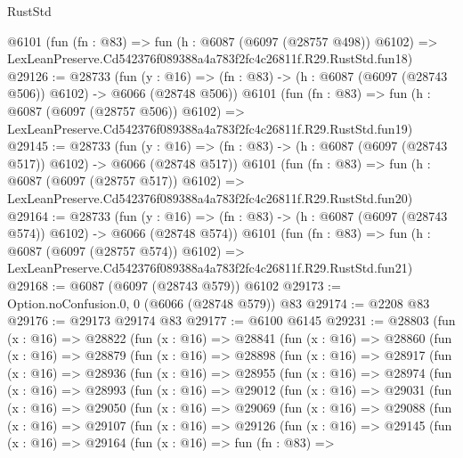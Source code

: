 \begin{lexlean}{RustStd}
\begin{coremodule}
    @6101
    (fun (fn : @83) =>
    fun (h : @6087 (@6097 (@28757 @498)) @6102) =>
    LexLeanPreserve.Cd542376f089388a4a783f2fc4c26811f.R29.RustStd.fun18)
@29126 := @28733
    (fun (y : @16) => (fn : @83) -> (h : @6087 (@6097 (@28743 @506)) @6102) -> @6066 (@28748 @506))
    @6101
    (fun (fn : @83) =>
    fun (h : @6087 (@6097 (@28757 @506)) @6102) =>
    LexLeanPreserve.Cd542376f089388a4a783f2fc4c26811f.R29.RustStd.fun19)
@29145 := @28733
    (fun (y : @16) => (fn : @83) -> (h : @6087 (@6097 (@28743 @517)) @6102) -> @6066 (@28748 @517))
    @6101
    (fun (fn : @83) =>
    fun (h : @6087 (@6097 (@28757 @517)) @6102) =>
    LexLeanPreserve.Cd542376f089388a4a783f2fc4c26811f.R29.RustStd.fun20)
@29164 := @28733
    (fun (y : @16) => (fn : @83) -> (h : @6087 (@6097 (@28743 @574)) @6102) -> @6066 (@28748 @574))
    @6101
    (fun (fn : @83) =>
    fun (h : @6087 (@6097 (@28757 @574)) @6102) =>
    LexLeanPreserve.Cd542376f089388a4a783f2fc4c26811f.R29.RustStd.fun21)
@29168 := @6087 (@6097 (@28743 @579)) @6102
@29173 := Option.noConfusion.{0, 0} (@6066 (@28748 @579)) @83
@29174 := @2208 @83
@29176 := @29173 @29174 @83
@29177 := @6100 @6145
@29231 := @28803
    (fun (x : @16) =>
    @28822
      (fun (x : @16) =>
      @28841
        (fun (x : @16) =>
        @28860
          (fun (x : @16) =>
          @28879
            (fun (x : @16) =>
            @28898
              (fun (x : @16) =>
              @28917
                (fun (x : @16) =>
                @28936
                  (fun (x : @16) =>
                  @28955
                    (fun (x : @16) =>
                    @28974
                      (fun (x : @16) =>
                      @28993
                        (fun (x : @16) =>
                        @29012
                          (fun (x : @16) =>
                          @29031
                            (fun (x : @16) =>
                            @29050
                              (fun (x : @16) =>
                              @29069
                                (fun (x : @16) =>
                                @29088
                                  (fun (x : @16) =>
                                  @29107
                                    (fun (x : @16) =>
                                    @29126
                                      (fun (x : @16) =>
                                      @29145
                                        (fun (x : @16) =>
                                        @29164
                                          (fun (x : @16) =>
                                          fun (fn : @83) =>

\end{coremodule}
\end{lexlean}
